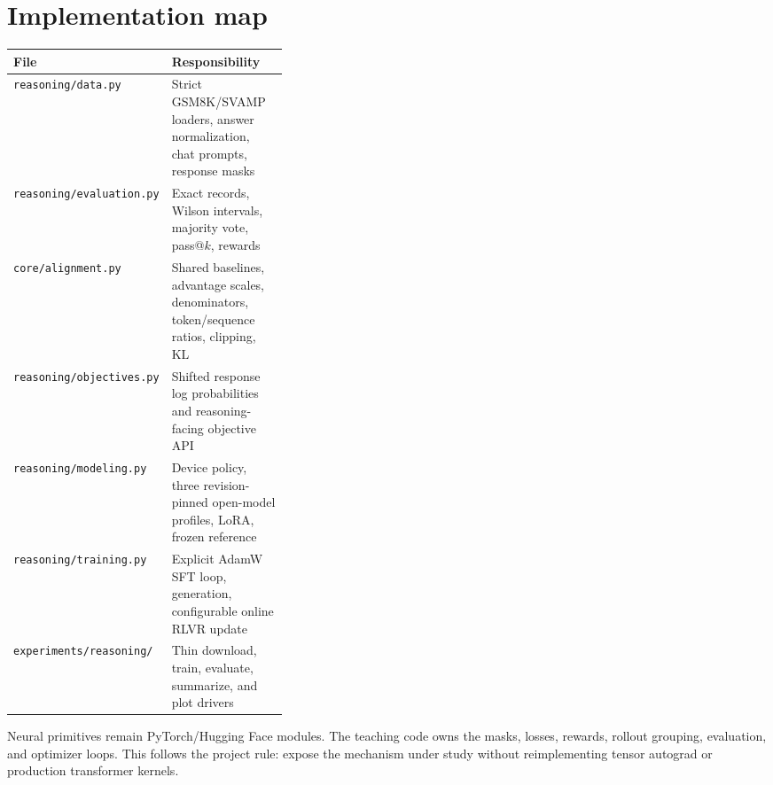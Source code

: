 \documentclass[11pt]{article}
\begin{document}
\section{Implementation map}
\begin{center}
\begin{tabularx}{\linewidth}{p{0.36\linewidth}X}
\toprule
File & Responsibility \\
\midrule
\texttt{reasoning/data.py} & Strict GSM8K/SVAMP loaders, answer normalization, chat prompts, response masks \\
\texttt{reasoning/evaluation.py} & Exact records, Wilson intervals, majority vote, pass@$k$, rewards \\
\texttt{core/alignment.py} & Shared baselines, advantage scales, denominators, token/sequence ratios, clipping, KL \\
\texttt{reasoning/objectives.py} & Shifted response log probabilities and reasoning-facing objective API \\
\texttt{reasoning/modeling.py} & Device policy, three revision-pinned open-model profiles, LoRA, frozen reference \\
\texttt{reasoning/training.py} & Explicit AdamW SFT loop, generation, configurable online RLVR update \\
\texttt{experiments/reasoning/} & Thin download, train, evaluate, summarize, and plot drivers \\
\bottomrule
\end{tabularx}
\end{center}

Neural primitives remain PyTorch/Hugging Face modules. The teaching code owns
the masks, losses, rewards, rollout grouping, evaluation, and optimizer loops.
This follows the project rule: expose the mechanism under study without
reimplementing tensor autograd or production transformer kernels.
\end{document}
